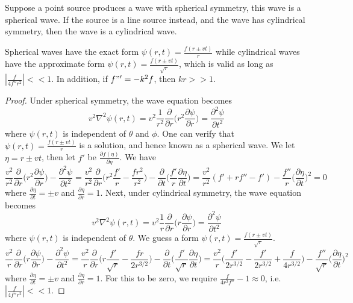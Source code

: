 \documentclass[a4paper]{article}
\begin{document}
\begin{defi}
Suppose a point source produces a wave with spherical symmetry, this wave is a spherical wave. If the source is a line source instead, and the wave has cylindrical symmetry, then the wave is a cylindrical wave.
\end{defi}
\begin{thm}
Spherical waves have the exact form $\psi(r,t)=\frac{f(r\pm vt)}{r}$ while cylindrical waves have the approximate form $\psi(r,t)=\frac{f(r\pm vt)}{\sqrt{r}}$, which is valid as long as $|\frac{f}{4f''r^2}|<<1$. In addition, if $f"'=-k^2f$, then $kr>>1$.
\end{thm}
\begin{proof}
Under spherical symmetry, the wave equation becomes $$v^2\nabla^2\psi(r,t)=v^2\frac{1}{r^2}\frac{\partial}{\partial r}\bigg(r^2\frac{\partial\psi}{\partial r}\bigg)=\frac{\partial^2\psi}{\partial t^2}$$
where $\psi(r,t)$ is independent of $\theta$ and $\phi$. One can verify that $\psi(r,t)=\frac{f(r\pm vt)}{r}$ is a solution, and hence known as a spherical wave. We let $\eta=r\pm vt$, then let $f'$ be $\frac{\partial f(\eta)}{\partial\eta}$. We have
$$\frac{v^2}{r^2}\frac{\partial}{\partial r}\bigg(r^2\frac{\partial\psi}{\partial r}\bigg)-\frac{\partial^2\psi}{\partial t^2}=\frac{v^2}{r^2}\frac{\partial}{\partial r}\bigg(r^2\frac{f'}{r}-\frac{fr^2}{r^2}\bigg)-\frac{\partial}{\partial t}\bigg(\frac{f'}{r}\frac{\partial\eta}{\partial t}\bigg)=\frac{v^2}{r^2}(f'+rf''-f')-\frac{f''}{r}\bigg(\frac{\partial\eta}{\partial t}\bigg)^2=0$$
where $\frac{\partial\eta}{\partial t}=\pm v$ and $\frac{\partial\eta}{\partial r}=1$. Next, under cylindrical symmetry, the wave equation becomes $$v^2\nabla^2\psi(r,t)=v^2\frac{1}{r}\frac{\partial}{\partial r}\bigg(r\frac{\partial\psi}{\partial r}\bigg)=\frac{\partial^2\psi}{\partial t^2}$$
where $\psi(r,t)$ is independent of $\theta$. We guess a form $\psi(r,t)=\frac{f(r\pm vt)}{\sqrt{r}}$.
$$\frac{v^2}{r}\frac{\partial}{\partial r}\bigg(r\frac{\partial\psi}{\partial r}\bigg)-\frac{\partial^2\psi}{\partial t^2}=\frac{v^2}{r}\frac{\partial}{\partial r}\bigg(r\frac{f'}{\sqrt{r}}-\frac{fr}{2r^{3/2}}\bigg)-\frac{\partial}{\partial t}\bigg(\frac{f'}{\sqrt{r}}\frac{\partial\eta}{\partial t}\bigg)=\frac{v^2}{r}\bigg(\frac{f'}{2r^{3/2}}-\frac{f'}{2r^{3/2}}+\frac{f}{4r^{3/2}}\bigg)-\frac{f''}{\sqrt{r}}\bigg(\frac{\partial\eta}{\partial t}\bigg)^2$$
where $\frac{\partial\eta}{\partial t}=\pm v$ and $\frac{\partial\eta}{\partial r}=1$. For this to be zero, we require $\frac{f}{4r^2f''}-1\approx0$, i.e. $|\frac{f}{4f''r^2}|<<1$.
\end{proof}
\end{document}
